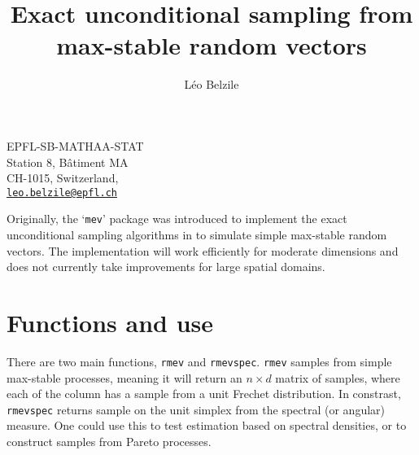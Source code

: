 \documentclass{article}
\newcommand{\code}[1]{\texttt{#1}}
\begin{document}


\title{Exact unconditional sampling from max-stable random vectors}
\author{Léo Belzile}
\date{}
\maketitle
\begin{center}
{ \small 
EPFL-SB-MATHAA-STAT \\ Station 8, Bâtiment MA \\CH-1015, Switzerland,\\ \href{leo.belzile@epfl.ch}{\texttt{leo.belzile@epfl.ch}}
}
\end{center}

Originally, the `\code{mev}' package was introduced to implement the exact unconditional sampling algorithms in \cite{Dombry:2016} to simulate simple max-stable random vectors. The implementation will work efficiently for moderate dimensions and does not currently take improvements for large spatial domains. 

\section{Functions and use}

There are two main functions, \code{rmev} and \code{rmevspec}. \code{rmev} samples from simple max-stable processes, meaning it will return an $n \times d$ matrix of samples, where each of the column has a sample from a unit Frechet distribution. In constrast, \code{rmevspec} returns sample on the unit simplex from the spectral (or angular) measure. One could use this to test estimation based on spectral densities, or to construct samples from Pareto processes.
\end{document}
